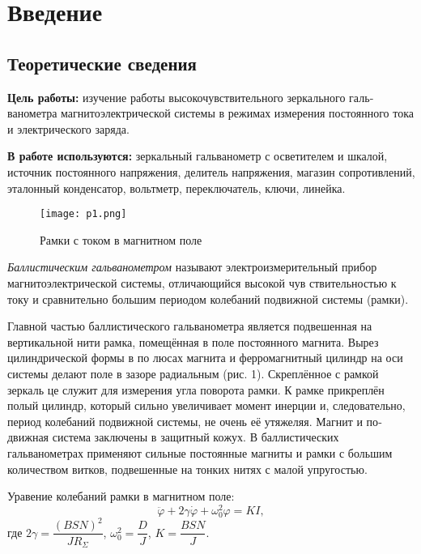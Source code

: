 \section{Введение}
\subsection{Теоретические сведения}

\textbf{Цель работы:}
изучение работы высокочувствительного зеркального галь­ ванометра магнитоэлектрической системы в режимах измерения постоян­ного тока и электрического заряда.

\textbf{В работе используются:}
зеркальный гальванометр с осветителем и шка­лой, источник постоянного напряжения, делитель напряжения, магазин со­противлений, эталонный конденсатор, вольтметр, переключатель, ключи, линейка.

\begin{wrapfigure}{r}{0.5\linewidth} %
\centering %
\texttt{[image: p1.png]}
\caption{Рамки с током в магнитном поле} %
\label{pic:my} %
\end{wrapfigure}

\textit{Баллистическим гальванометром} называют электроизмерительный прибор магнитоэлектрической системы, отличающийся высокой чув­ ствительностью к току и сравнительно большим периодом колебаний подвижной системы (рамки).

Главной частью баллистического гальвано­метра является подвешенная на вертикальной нити рамка, помещённая в поле постоянного магнита. Вырез цилиндрической формы в по­ люсах магнита и ферромагнитный цилиндр на оси системы делают поле в зазоре радиаль­ным (рис. 1). Скреплённое с рамкой зеркаль­ це служит для измерения угла поворота рам­ки. К рамке прикреплён полый цилиндр, ко­торый сильно увеличивает момент инерции и, следовательно, период колебаний подвижной системы, не очень её утяжеляя. Магнит и по­ движная система заключены в защитный ко­жух. В баллистических гальванометрах
при­меняют сильные постоянные магниты и рамки с большим количеством витков, подвешенные на тонких нитях с малой упругостью.

Уравение колебаний рамки в магнитном поле:
\begin{equation}
    \ddot{\varphi} + 2 \gamma\dot{\varphi} + \omega_0^2\varphi = KI,
    \label{equ:ddotvarphi}
\end{equation}
где $ 2\gamma = \dfrac{(BSN)^2}{JR_\Sigma}$, $\omega_0^2 = \dfrac{D}{J}$, $K = \dfrac{BSN}{J}$.

